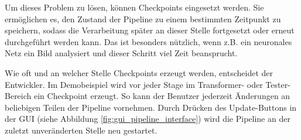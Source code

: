\documentclass[a4paper]{article} %
\begin{document}
Um dieses Problem zu lösen, können Checkpoints eingesetzt werden. Sie ermöglichen es, den Zustand der Pipeline zu einem bestimmten Zeitpunkt zu speichern, sodass die Verarbeitung später an dieser Stelle fortgesetzt oder erneut durchgeführt werden kann. Das ist besonders nützlich, wenn z.B. ein neuronales Netz ein Bild analysiert und dieser Schritt viel Zeit beansprucht.

Wie oft und an welcher Stelle Checkpoints erzeugt werden, entscheidet der Entwickler. Im Demobeispiel wird vor jeder Stage im Transformer- oder Tester-Bereich ein Checkpoint erzeugt. So kann der Benutzer jederzeit Änderungen an beliebigen Teilen der Pipeline vornehmen. Durch Drücken des Update-Buttons in der GUI (siehe Abbildung \ref{fig:gui_pipeline_interface}) wird die Pipeline an der zuletzt unveränderten Stelle neu gestartet.
\end{document}
